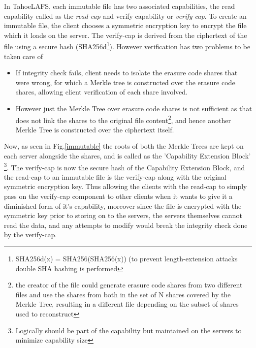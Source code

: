 In TahoeLAFS, each immutable file has two associated capabilities, the read capability called as the \textit{read-cap} and verify capability or 
\textit{verify-cap}. To create an immutable file, the client chooses a symmetric encryption key to encrypt the file which it loads on the server. The verify-cap is derived from the ciphertext of the file using a secure hash (SHA256d\footnote{SHA256d(x) = SHA256(SHA256(x)) (to prevent length-extension attacks double SHA hashing is performed}). However verification has two problems to be taken care of
\begin{itemize}
\item If integrity check fails, client needs to isolate the erasure code shares that were wrong, for which a Merkle tree is constructed over the erasure code shares, allowing client verification of each share involved.
\item However just the Merkle Tree over erasure code shares is not sufficient as that does not link the shares to the original file content\footnote{the creator of the file could generate erasure code shares from two different files and use the shares from both in the set of N shares covered by the Merkle Tree, resulting in a different file depending on the subset of shares used to reconstruct}, and hence another Merkle Tree is constructed over the ciphertext itself.
\end{itemize}
Now, as seen in Fig.\ref{immutable} the roots of both the Merkle Trees are kept on each server alongside the shares, and is called as the 'Capability Extension Block' \footnote{Logically should be part of the capability but maintained on the servers to minimize capability size}. The verify-cap is now the secure hash of the Capability Extension Block, and the read-cap to an immutable file is the verify-cap along with the original symmetric encryption key. Thus allowing the clients with the read-cap to simply pass on the verify-cap component to other clients when it wants to give it a diminished form of it's capability, moreover since the file is encrypted with the symmetric key prior to storing on to the servers, the servers themselves cannot read the data, and any attempts to modify would break the integrity check done by the verify-cap.

